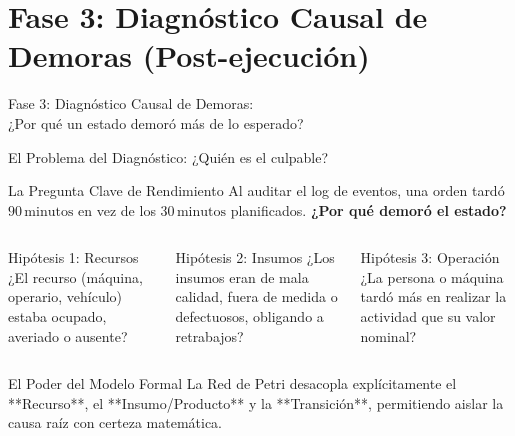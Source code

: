 \documentclass[10pt, aspectratio=169]{beamer}
\begin{document}
\section{Fase 3: Diagnóstico Causal de Demoras (Post-ejecución)}

\begin{frame}{}
	\centering
	\Huge{Fase 3: Diagnóstico Causal de Demoras: \\ ¿Por qué un estado demoró más de lo esperado?}
\end{frame}

\begin{frame}{El Problema del Diagnóstico: ¿Quién es el culpable?}
	\begin{block}{La Pregunta Clave de Rendimiento}
		Al auditar el log de eventos, una orden tardó $90\,\text{minutos}$ en vez de los $30\,\text{minutos}$ planificados.
		\textbf{¿Por qué demoró el estado?}
	\end{block}

	\begin{columns}
		\begin{alertblock}{Hipótesis 1: Recursos}
			¿El recurso (máquina, operario, vehículo) estaba ocupado, averiado o ausente?
		\end{alertblock}

		\begin{alertblock}{Hipótesis 2: Insumos}
			¿Los insumos eran de mala calidad, fuera de medida o defectuosos, obligando a retrabajos?
		\end{alertblock}

		\begin{alertblock}{Hipótesis 3: Operación}
			¿La persona o máquina tardó más en realizar la actividad que su valor nominal?
		\end{alertblock}
	\end{columns}

	\vspace{0.3cm}
	\begin{exampleblock}{El Poder del Modelo Formal}
		La Red de Petri desacopla explícitamente el **Recurso**, el **Insumo/Producto** y la **Transición**, permitiendo aislar la causa raíz con certeza matemática.
	\end{exampleblock}
\end{frame}
\end{document}

